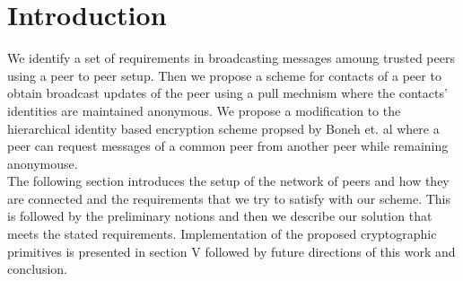 \section{Introduction}
We identify a set of requirements in broadcasting messages amoung trusted peers using a peer to peer setup. Then we propose a scheme for contacts of a peer to obtain broadcast updates of the peer using a pull mechnism where the contacts' identities are maintained anonymous. 
We propose a modification to the hierarchical identity based encryption scheme propsed by Boneh et. al \cite{BBG05} where a peer can request messages of a common peer from another peer while remaining anonymouse. \\
The following section introduces the setup of the network of peers and how they are connected and the requirements that we try to satisfy with our scheme. This is followed by the preliminary notions and then we describe our solution that meets the stated requirements. Implementation of the proposed cryptographic primitives is presented in section V followed by future directions of this work and conclusion.
